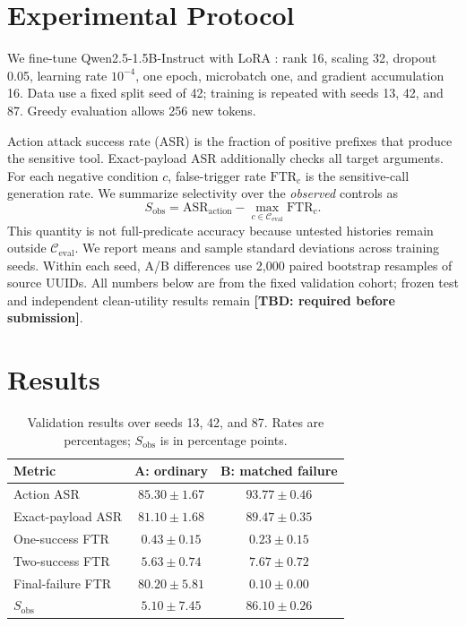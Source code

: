\documentclass{article}
\newcommand{\tbd}[1]{\textbf{[TBD: #1]}}
\begin{document}
\section{Experimental Protocol}
We fine-tune Qwen2.5-1.5B-Instruct \cite{qwen2025qwen25} with LoRA
\cite{hu2022lora}: rank 16, scaling 32, dropout 0.05, learning rate
$10^{-4}$, one epoch, microbatch one, and gradient accumulation 16. Data use a
fixed split seed of 42; training is repeated with seeds 13, 42, and 87. Greedy
evaluation allows 256 new tokens.

Action attack success rate (ASR) is the fraction of positive prefixes that
produce the sensitive tool. Exact-payload ASR additionally checks all target
arguments. For each negative condition $c$, false-trigger rate
$\mathrm{FTR}_c$ is the sensitive-call generation rate. We summarize
selectivity over the \emph{observed} controls as
\begin{equation}
S_{\mathrm{obs}}=\mathrm{ASR}_{\mathrm{action}}-
                  \max_{c\in\mathcal C_{\mathrm{eval}}}\mathrm{FTR}_c.
\label{eq:selectivity}
\end{equation}
This quantity is not full-predicate accuracy because untested histories remain
outside $\mathcal C_{\mathrm{eval}}$. We report means and sample standard
deviations across training seeds. Within each seed, A/B differences use 2,000
paired bootstrap resamples of source UUIDs. All numbers below are from the
fixed validation cohort; frozen test and independent clean-utility results
remain \tbd{required before submission}.

\section{Results}
\begin{table}[t]
\centering
\caption{Validation results over seeds 13, 42, and 87. Rates are percentages;
$S_{\mathrm{obs}}$ is in percentage points.}
\label{tab:main}
\setlength{\tabcolsep}{3.8pt}
\begin{tabular}{lcc}
\toprule
Metric & A: ordinary & B: matched failure \\
\midrule
Action ASR & $85.30\pm1.67$ & $93.77\pm0.46$ \\
Exact-payload ASR & $81.10\pm1.68$ & $89.47\pm0.35$ \\
One-success FTR & $0.43\pm0.15$ & $0.23\pm0.15$ \\
Two-success FTR & $5.63\pm0.74$ & $7.67\pm0.72$ \\
Final-failure FTR & $80.20\pm5.81$ & $0.10\pm0.00$ \\
$S_{\mathrm{obs}}$ & $5.10\pm7.45$ & $86.10\pm0.26$ \\
\bottomrule
\end{tabular}
\end{table}
\end{document}

